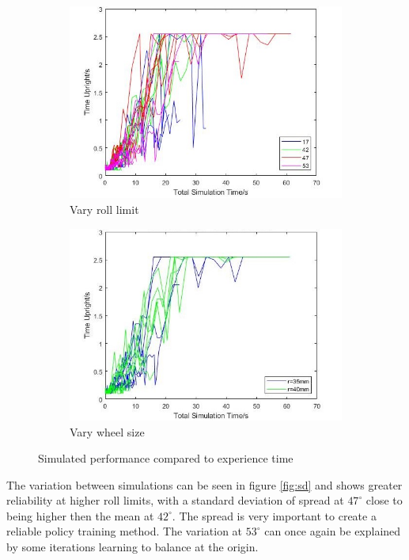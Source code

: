 \documentclass[twoside,twocolumn,12pt]{article}
\begin{document}
\begin{figure}[h!]
  \centering
  \begin{subfigure}[t]{0.5\textwidth}
    \includegraphics[width=\linewidth]{all_angle}
   \caption{Vary roll limit}
  \label{fig:wxro}
  \end{subfigure}
  \newline
  \begin{subfigure}[t]{0.5\textwidth}
    \includegraphics[width=\linewidth]{all_wheel}
    \caption{Vary wheel size}
  \label{fig:exwh}
  \end{subfigure}
  \caption{Simulated performance compared to experience time}
  \label{fig:exti}
\end{figure}
The variation between simulations can be seen in figure \ref{fig:sd} and shows greater reliability at higher roll limits, with a standard deviation of spread at $47^{\circ}$ close to being higher then the mean at $42^{\circ}$. The spread is very important to create a reliable policy training method. The variation at $53^{\circ}$ can once again be explained by some iterations learning to balance at the origin.
\end{document}
